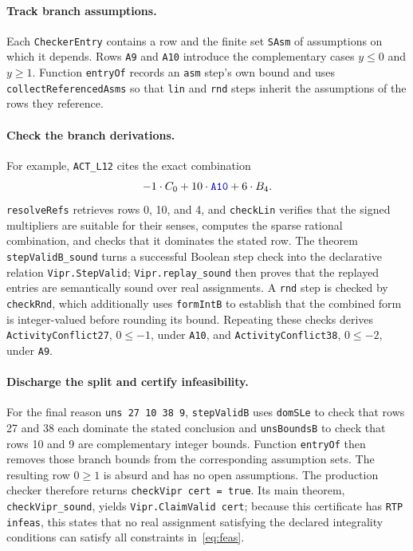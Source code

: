 \documentclass{article}
\newcommand{\code}[1]{\textcolor{blue!70!black}{\texttt{#1}}}
\begin{document}
\paragraph{Track branch assumptions.}
Each \code{CheckerEntry} contains a row and the finite set \code{SAsm} of assumptions on which it depends.
Rows \code{A9} and \code{A10} introduce the complementary cases $y\le0$ and $y\ge1$.
Function \code{entryOf} records an \code{asm} step's own bound and uses \code{collectReferencedAsms} so that \code{lin} and \code{rnd} steps inherit the assumptions of the rows they reference.

\paragraph{Check the branch derivations.}
For example, \code{ACT\_L12} cites the exact combination
\[
 -1\cdot C_0 + 10\cdot\code{A10} + 6\cdot B_4.
\]
\code{resolveRefs} retrieves rows 0, 10, and 4, and \code{checkLin} verifies that the signed multipliers are suitable for their senses, computes the sparse rational combination, and checks that it dominates the stated row.
The theorem \code{stepValidB\_sound} turns a successful Boolean step check into the declarative relation \code{Vipr.StepValid}; \code{Vipr.replay\_sound} then proves that the replayed entries are semantically sound over real assignments.
A \code{rnd} step is checked by \code{checkRnd}, which additionally uses \code{formIntB} to establish that the combined form is integer-valued before rounding its bound.
Repeating these checks derives \code{ActivityConflict27}, $0\le-1$, under \code{A10}, and \code{ActivityConflict38}, $0\le-2$, under \code{A9}.

\paragraph{Discharge the split and certify infeasibility.}
For the final reason \code{uns 27 10 38 9}, \code{stepValidB} uses \code{domSLe} to check that rows 27 and 38 each dominate the stated conclusion and \code{unsBoundsB} to check that rows 10 and 9 are complementary integer bounds.
Function \code{entryOf} then removes those branch bounds from the corresponding assumption sets.
The resulting row $0\ge1$ is absurd and has no open assumptions.
The production checker therefore returns \code{checkVipr cert = true}.
Its main theorem, \code{checkVipr\_sound}, yields \code{Vipr.ClaimValid cert}; because this certificate has \code{RTP infeas}, this states that no real assignment satisfying the declared integrality conditions can satisfy all constraints in~\autoref{eq:feas}.
\end{document}
